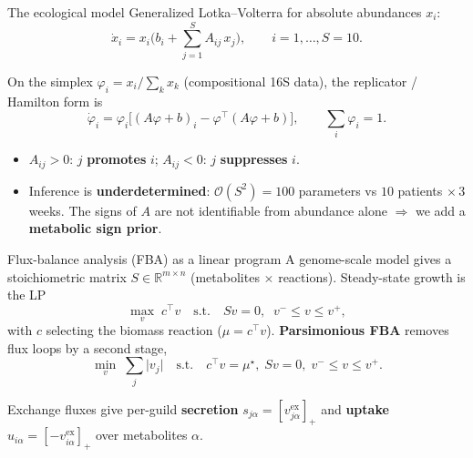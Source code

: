 \documentclass[
  ignorenonframetext,
  aspectratio=169,
]{beamer}
\providecommand{\tightlist}{%
  \setlength{\itemsep}{0pt}\setlength{\parskip}{0pt}}
\begin{document}
\begin{frame}{The ecological model}
\protect\hypertarget{the-ecological-model}{}
Generalized Lotka--Volterra for absolute abundances \(x_i\):
\[\dot{x}_i = x_i\Big(b_i + \sum_{j=1}^{S} A_{ij}\,x_j\Big),\qquad i=1,\dots,S=10 .\]

On the simplex \(\varphi_i = x_i/\sum_k x_k\) (compositional 16S data),
the replicator / Hamilton form is
\[\dot{\varphi}_i = \varphi_i\Big[(A\varphi+b)_i - \varphi^{\!\top}(A\varphi+b)\Big],
\qquad \sum_i \varphi_i = 1 .\]

\begin{itemize}
\tightlist
\item
  \(A_{ij}>0\): \(j\) \textbf{promotes} \(i\); \(A_{ij}<0\): \(j\)
  \textbf{suppresses} \(i\).
\item
  Inference is \textbf{underdetermined}: \(\mathcal{O}(S^2)=100\)
  parameters vs \(10\) patients \(\times\,3\) weeks. The signs of \(A\)
  are not identifiable from abundance alone \(\Rightarrow\) we add a
  \textbf{metabolic sign prior}.
\end{itemize}
\end{frame}

\begin{frame}{Flux-balance analysis (FBA) as a linear program}
\protect\hypertarget{flux-balance-analysis-fba-as-a-linear-program}{}
A genome-scale model gives a stoichiometric matrix
\(S\in\mathbb{R}^{m\times n}\) (metabolites \(\times\) reactions).
Steady-state growth is the LP
\[\max_{v}\; c^{\!\top} v \quad\text{s.t.}\quad S v = 0,\;\; v^{-}\le v \le v^{+},\]
with \(c\) selecting the biomass reaction (\(\mu = c^{\!\top}v\)).
\textbf{Parsimonious FBA} removes flux loops by a second stage,
\[\min_{v}\; \sum_{j}\lvert v_j\rvert \quad\text{s.t.}\quad c^{\!\top}v=\mu^{\star},\; Sv=0,\; v^{-}\le v\le v^{+}.\]

Exchange fluxes give per-guild \textbf{secretion}
\(s_{j\alpha}=\left[v^{\text{ex}}_{j\alpha}\right]_{+}\) and
\textbf{uptake}
\(u_{i\alpha}=\left[-v^{\text{ex}}_{i\alpha}\right]_{+}\) over
metabolites \(\alpha\).
\end{frame}
\end{document}
